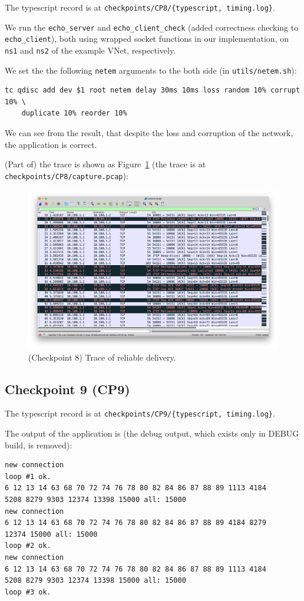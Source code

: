 \documentclass[a4paper]{article}
\begin{document}
  The typescript record is at \texttt{checkpoints/CP8/\{typescript, timing.log\}}.

  We run the \texttt{echo\_server} and \texttt{echo\_client\_check} (added correctness checking to \texttt{echo\_client}), both using wrapped socket functions in our implementation, on \texttt{ns1} and \texttt{ns2} of the example VNet, respectively.

  We set the the following \texttt{netem} arguments to the both side (in \texttt{utils/netem.sh}):
  \begin{verbatim}
tc qdisc add dev $1 root netem delay 30ms 10ms loss random 10% corrupt 10% \
    duplicate 10% reorder 10%
  \end{verbatim}

  We can see from the result, that despite the loss and corruption of the network, the application is correct.

  (Part of) the trace is shown as Figure~\ref{fig:CP8} (the trace is at \texttt{checkpoints/CP8/capture.pcap}):

  \begin{figure}
    \includegraphics[width=\textwidth]{resources/CP8.png}
    \caption{(Checkpoint 8) Trace of reliable delivery.} \label{fig:CP8}
  \end{figure}

  \subsection{Checkpoint 9 (CP9)}

  The typescript record is at \texttt{checkpoints/CP9/\{typescript, timing.log\}}.

  The output of the application is (the debug output, which exists only in DEBUG build, is removed):
  \begin{verbatim}
new connection
loop #1 ok.
6 12 13 14 63 68 70 72 74 76 78 80 82 84 86 87 88 89 1113 4184
5208 8279 9303 12374 13398 15000 all: 15000
new connection
6 12 13 14 63 68 70 72 74 76 78 80 82 84 86 87 88 89 4184 8279
12374 15000 all: 15000
loop #2 ok.
new connection
6 12 13 14 63 68 70 72 74 76 78 80 82 84 86 87 88 89 1113 4184
5208 8279 9303 12374 13398 15000 all: 15000
loop #3 ok.
  \end{verbatim}
\end{document}
